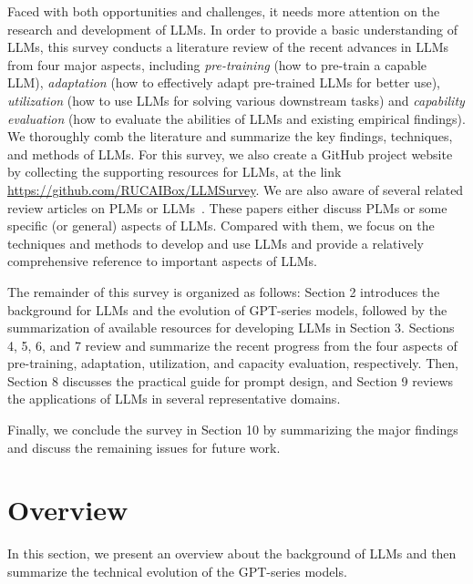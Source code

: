 Faced with both opportunities and challenges, it needs more  attention on the research and development of LLMs. In order to provide a basic understanding of LLMs, this survey conducts a literature review of the recent advances in LLMs from four major aspects, including \emph{pre-training} (how to pre-train a capable LLM), \emph{adaptation} (how to effectively adapt pre-trained LLMs for better use), \emph{utilization} (how to use LLMs for solving various downstream tasks) and   
\emph{capability evaluation} (how to evaluate the abilities of LLMs and existing empirical findings). We thoroughly comb the literature and summarize the key findings, techniques, and methods of LLMs. For this survey, we also create a GitHub project website by collecting the supporting resources for LLMs, at the link \url{https://github.com/RUCAIBox/LLMSurvey}.  
We are also aware of several related review articles on PLMs or LLMs~\cite{Han-AIopen-2021-PTM,qiu-CoRR-2020-PTM,Li-IJCAI-2021-Pretrained,Liu-survey-2023-Pre-train,Lu-arxiv-2022-Survey,Dong-arxiv-2023-A,Shanahan-arxiv-2022-Talking,Huang-arxiv-2022-Towards,Qiao-arxiv-2022-Reasoning,Cao-arxiv-2023-comprehensive,Zhou-FITEE-2023-ChatGPT,Zhao-arxiv-2022-Dense}. These papers either  discuss PLMs or some specific (or general) aspects of LLMs. Compared with them, we focus on the techniques and methods to develop and use LLMs and provide a relatively comprehensive reference to important aspects  of LLMs. 

The remainder of this survey is organized as follows: Section 2 introduces the background for LLMs and the evolution of GPT-series models, followed by the summarization of available resources for developing LLMs in Section 3. Sections 4, 5, 6, and 7 review and summarize the recent progress from the four aspects of pre-training, adaptation, utilization, and capacity evaluation, respectively. Then, Section 8 discusses the practical guide for prompt design, and Section 9 reviews the applications of LLMs in several representative domains. 

Finally, we conclude the survey in Section 10 by summarizing the major findings and discuss the remaining issues for future work. 

\section{Overview}
\label{sec-overview}
In this section, we present an overview  about the background of LLMs and then summarize the technical evolution of the GPT-series models.

